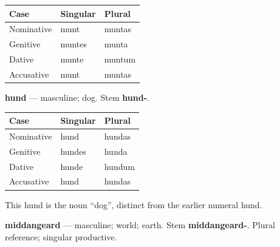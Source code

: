 \par\begingroup
\fontsize{10.5}{13.2}\selectfont
\setlength{\LTleft}{0pt}\setlength{\LTright}{\fill}
\noindent
\begin{tabular}{@{}>{\raggedright\arraybackslash}p{39.46mm}>{\raggedright\arraybackslash}p{39.46mm}>{\raggedright\arraybackslash}p{39.46mm}@{}}
\toprule
\textbf{Case} & \textbf{Singular} & \textbf{Plural} \\
\midrule
Nominative & munt & muntas \\
Genitive & muntes & munta \\
Dative & munte & muntum \\
Accusative & munt & muntas \\
\bottomrule
\end{tabular}
\par\endgroup

\textbf{hund} — masculine; dog. Stem \textbf{hund-}.

\par\begingroup
\fontsize{10.5}{13.2}\selectfont
\setlength{\LTleft}{0pt}\setlength{\LTright}{\fill}
\noindent
\begin{tabular}{@{}>{\raggedright\arraybackslash}p{39.46mm}>{\raggedright\arraybackslash}p{39.46mm}>{\raggedright\arraybackslash}p{39.46mm}@{}}
\toprule
\textbf{Case} & \textbf{Singular} & \textbf{Plural} \\
\midrule
Nominative & hund & hundas \\
Genitive & hundes & hunda \\
Dative & hunde & hundum \\
Accusative & hund & hundas \\
\bottomrule
\end{tabular}
\par\endgroup

This hund is the noun “dog”, distinct from the earlier numeral hund.

\textbf{middangeard} — masculine; world; earth. Stem \textbf{middangeard-}. Plural reference; singular productive.


